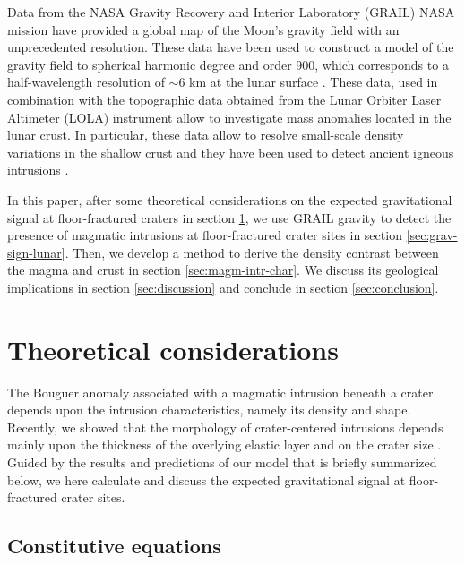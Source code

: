 Data from  the NASA Gravity  Recovery and Interior  Laboratory (GRAIL)
NASA mission  have provided a global  map of the Moon's  gravity field
with  an  unprecedented resolution.   These  data  have been  used  to
construct a  model of the  gravity field to spherical  harmonic degree
and order  900, which corresponds  to a half-wavelength  resolution of
$\sim 6$ km at the lunar surface \citep{Zuber:2013cp,Konopliv:2014gm}.
These data,  used in  combination with  the topographic  data obtained
from  the Lunar  Orbiter Laser  Altimeter (LOLA)  instrument allow  to
investigate mass anomalies located in the lunar crust.  In particular,
these  data allow  to resolve  small-scale density  variations in  the
shallow crust \citep{Besserer:2014jr,Wieczorek:2013ipa}  and they have
been     used     to     detect     ancient     igneous     intrusions
\citep{AndrewsHanna:2013ft}.

In this paper,  after some theoretical considerations  on the expected
gravitational   signal   at   floor-fractured   craters   in   section
\ref{sec:theor-cons}, we use  GRAIL gravity to detect  the presence of
magmatic  intrusions  at  floor-fractured   crater  sites  in  section
\ref{sec:grav-sign-lunar}.  Then,  we develop  a method to  derive the
density   contrast   between   the   magma  and   crust   in   section
\ref{sec:magm-intr-char}.  We  discuss its geological  implications in
section     \ref{sec:discussion}    and     conclude    in     section
\ref{sec:conclusion}.

\section{Theoretical considerations}
\label{sec:theor-cons}

The Bouguer  anomaly associated  with a  magmatic intrusion  beneath a
crater depends upon the  intrusion characteristics, namely its density
and shape.  Recently, we showed that the morphology of crater-centered
intrusions depends mainly upon the  thickness of the overlying elastic
layer and  on the  crater size  \citep{Thorey:2014cv}.  Guided  by the
results and predictions of our model that is briefly summarized below,
we here  calculate and  discuss the  expected gravitational  signal at
floor-fractured crater sites.

\subsection{Constitutive equations}
\label{sec:const-equat-1}

